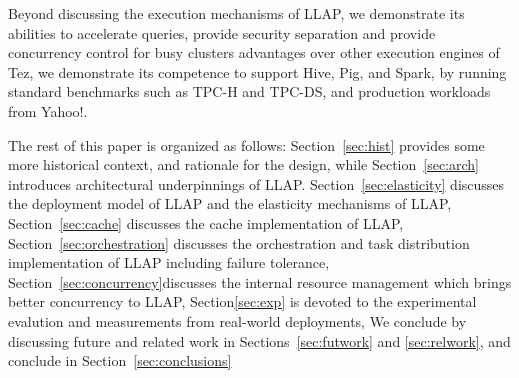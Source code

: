 Beyond discussing the execution mechanisms of LLAP, we demonstrate its abilities to accelerate queries, provide security separation and provide concurrency control for busy clusters advantages over other execution engines of Tez, we demonstrate its competence to support Hive, Pig, and Spark, by running standard benchmarks such as TPC-H and TPC-DS, and production workloads from Yahoo!. 

The rest of this paper is organized as follows: 
Section~\ref{sec:hist} provides some more historical context, and rationale for the design, 
while Section~\ref{sec:arch} introduces architectural underpinnings of LLAP. 
Section~\ref{sec:elasticity} discusses the deployment model of LLAP and the elasticity mechanisms of LLAP, 
Section~\ref{sec:cache} discusses the cache implementation of LLAP, 
Section~\ref{sec:orchestration} discusses the orchestration and task distribution implementation of LLAP including failure tolerance,
Section~\ref{sec:concurrency}discusses the internal resource management which brings better concurrency to LLAP,
Section\ref{sec:exp} is devoted to the experimental evalution and measurements from real-world deployments,
We conclude by discussing future and related work in Sections~\ref{sec:futwork} and \ref{sec:relwork}, 
and conclude in Section~\ref{sec:conclusions}
